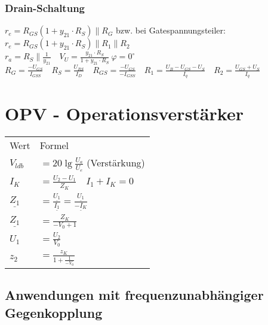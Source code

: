     \subsubsection{Drain-Schaltung}
    $r_e=R_{GS}(1+y_{21}\cdot R_S)\parallel R_G$ bzw. bei Gatespannungsteiler: $r_e=R_{GS}(1+y_{21}\cdot R_S)\parallel R_1\parallel R_2$ \\
    $r_a=R_S\parallel \frac{1}{y_{21}}\quad V_U=\frac{y_{21}\cdot R_S}{1+y_{21}\cdot R_S}\: \varphi=0^{\circ}$ \\ %
    $R_G=\frac{-U_{GS}}{I_{GSS}}\quad R_S=\frac{U_{RS}}{I_D}\quad R_{GS}=\frac{-U_{GS}}{-I_{GSS}}\quad R_1=\frac{U_B-U_{GS}-U_S}{I_q}\quad R_2=\frac{U_{GS}+U_S}{I_q}$ %
    \section{OPV - Operationsverstärker}
    \begin{minipage}{0.5\columnwidth}
        \renewcommand{\arraystretch}{1.05}
        \begin{table}[H]
            \begin{tabularx}{\columnwidth}{l l}
                Wert & Formel \\
                $V_{ldb}$ & $=20\lg\frac{U_a}{U_e}$ (Verstärkung)\\
                $I_K$ & $=\frac{U_2-U_1}{Z_K}\quad I_1+I_K=0$\\
                $\underline{Z_1}$ & $=\frac{\underline{U_1}}{\underline{I_1}}=\frac{\underline{U_1}}{\underline{-I_K}}$\\
                $\underline{Z_1}$ & $=\frac{Z_K}{-V_0+1}$\\
                $U_1$ & $=\frac{U_2}{V_0}$ \\
                $z_2$ & $=\frac{z_K}{1+\frac{1}{-V_0}}$
            \end{tabularx}
        \end{table}
    \end{minipage}
    \begin{minipage}{0.5\columnwidth}
    \end{minipage}
    \subsection{Anwendungen mit frequenzunabhängiger Gegenkopplung}
